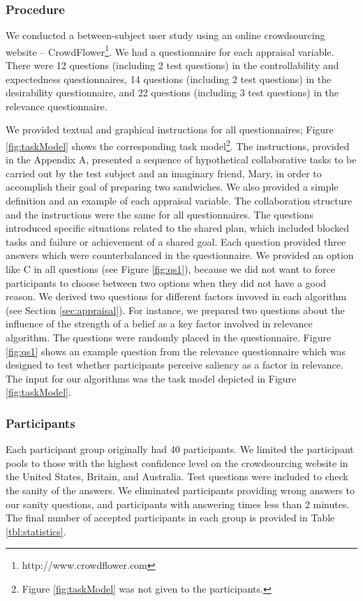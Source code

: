 \documentclass[12pt]{report}
\begin{document}
\subsubsection{Procedure}
 We conducted a between-subject user study using an online crowdsourcing website
 -- CrowdFlower\footnote{http://www.crowdflower.com}. We had a questionnaire for
 each appraisal variable. There were 12 questions (including 2 test questions)
 in the controllability and expectedness questionnaires, 14 questions (including
 2 test questions) in the desirability questionnaire, and 22 questions
 (including 3 test questions) in the relevance questionnaire.
 
We provided textual and graphical instructions for all questionnaires; Figure
\ref{fig:taskModel} shows the corresponding task
model\footnote{Figure \ref{fig:taskModel} was not given to the
participants.}. The instructions, provided in the Appendix A, presented a
sequence of hypothetical collaborative tasks to be carried out by the test subject and an imaginary friend, Mary, in
order to accomplish their goal of preparing two sandwiches. We also provided a
simple definition and an example of each appraisal variable. The collaboration
structure and the instructions were the same for all questionnaires. The
questions introduced specific situations related to the shared plan, which
included blocked tasks and failure or achievement of a shared goal. Each
question provided three answers which were counterbalanced in the questionnaire.
We provided an option like C in all questions (see Figure \ref{fig:qs1}),
because we did not want to force participants to choose between two options when
they did not have a good reason. We derived two questions for
different factors invoved in each algorithm (see Section \ref{sec:appraisal}).
For instance, we prepared two questions about the influence of the strength of a
belief as a key factor involved in relevance algorithm. The questions were
randomly placed in the questionnaire. Figure \ref{fig:qs1} shows an example
question from the relevance questionnaire which was designed to test whether
participants perceive saliency as a factor in relevance. The input for our
algorithms was the task model depicted in Figure \ref{fig:taskModel}.

\subsubsection{Participants}
Each participant group originally had 40 participants. We limited the
participant pools to those with the highest confidence level on the
crowdsourcing website in the United States, Britain, and Australia. Test
questions were included to check the sanity of the answers. We eliminated
participants providing wrong answers to our sanity questions, and participants with
answering times less than 2 minutes. The final number of accepted participants
in each group is provided in Table \ref{tbl:statistics}.
\end{document}
